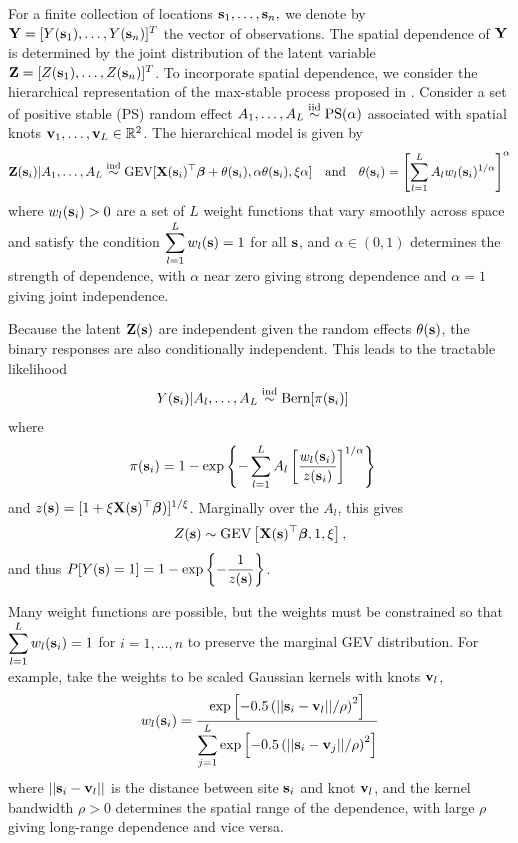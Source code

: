 For a finite collection of locations $\mathbf{s}_1, \ldots, \mathbf{s}_n,$ we denote by $\mathbf{Y} = [Y(\mathbf{s}_1), \ldots, Y(\mathbf{s}_n)]^T$ the vector of observations.
The spatial dependence of $\mathbf{Y}$ is determined by the joint distribution of the latent variable $\mathbf{Z} = [Z(\mathbf{s}_1),\ldots, Z(\mathbf{s}_n)]^T$.
To incorporate spatial dependence, we consider the hierarchical representation of the max-stable process proposed in \citet{Reich2012}.
Consider a set of positive stable (PS) random effect $A_1, \ldots, A_L \stackrel{\mathrm{iid}}{\sim} \text{PS}(\alpha)$ associated with spatial knots $\mathbf{v}_1, \ldots, \mathbf{v}_L \in \mathbb{R}^2$.
The hierarchical model is given by
\begin{align} \label{rbeq:hiermodel}
\mathbf{Z}(\mathbf{s}_i) | A_1, \ldots, A_L \stackrel{\mathrm{ind}}{\sim} \text{GEV}[\mathbf{X}(\mathbf{s}_i)^\top \mbox{\boldmath $\beta$} + \theta(\mathbf{s}_i), \alpha \theta(\mathbf{s}_i), \xi \alpha] \quad \text{and} \quad \theta(\mathbf{s}_i) = \left[\sum_{l = 1}^L A_l w_l (\mathbf{s}_i)^{1 / \alpha} \right]^\alpha
\end{align}
where $w_{l}(\mathbf{s}_i) > 0$ are a set of $L$ weight functions that vary smoothly across space and satisfy the condition \mbox{$\displaystyle \sum_{l = 1}^L w_l(\mathbf{s}) = 1$} for all $\mathbf{s}$, and $\alpha\in(0,1)$ determines the strength of dependence, with $\alpha$ near zero giving strong dependence and $\alpha=1$ giving joint independence.

Because the latent $\mathbf{Z}(\mathbf{s})$ are independent given the random effects $\theta(\mathbf{s})$, the binary responses are also conditionally independent.
This leads to the tractable likelihood
\begin{align} \label{rbeq:condlike}
Y(\mathbf{s}_i) | A_l, \ldots, A_L &\stackrel{\mathrm{ind}}{\sim} \text{Bern}[\pi(\mathbf{s}_i)]
\end{align}
where
\begin{align} \label{rbeq:pyeq1cond}
\pi(\mathbf{s}_i) &= 1 - \exp \left\{ -\displaystyle \sum_{ l = 1 }^{L} A_l \left[ \frac{ w_{l}(\mathbf{s}_i) }{ z(\mathbf{s}_i) } \right]^{ 1/\alpha} \right\}
\end{align}
and $z(\mathbf{s}) = [1 + \xi \mathbf{X}(\mathbf{s})^\top \mbox{\boldmath $\beta$})]^{1 / \xi}$.
Marginally over the $A_l$, this gives
\begin{align}
Z(\mathbf{s}) \sim \text{GEV}\left[\mathbf{X}(\mathbf{s})^\top \mbox{\boldmath $\beta$}, 1, \xi\right],
\end{align}
and thus $P[Y(\mathbf{s}) = 1] = 1 - \exp\left\{-\displaystyle \frac{1}{z(\mathbf{s})}\right\}$.

Many weight functions are possible, but the weights must be constrained so that $\displaystyle \sum_{l=1}^L w_{l}(\mathbf{s}_i)=1$ for $i=1,\ldots,n$ to preserve the marginal GEV distribution.
For example, \cite{Reich2012} take the weights to be scaled Gaussian kernels with knots $\mathbf{v}_l$,
\begin{align}\label{rbeq:w}
w_{l}(\mathbf{s}_i) = \frac{\exp\left[-0.5\left(||\mathbf{s}_i-\mathbf{v}_l||/\rho\right)^2\right]}
{\displaystyle \sum_{j=1}^L\exp\left[-0.5\left(||\mathbf{s}_i-\mathbf{v}_j||/\rho\right)^2\right]}
\end{align}
where $||\mathbf{s}_i - \mathbf{v}_l||$ is the distance between site $\mathbf{s}_i$ and knot $\mathbf{v}_l$, and the kernel bandwidth $\rho>0$ determines the spatial range of the dependence, with large $\rho$ giving long-range dependence and vice versa.

